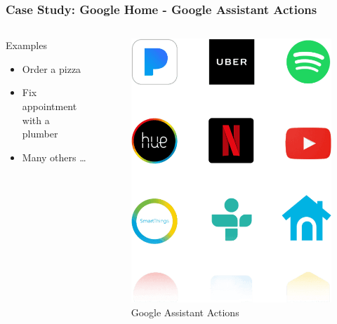 \documentclass{beamer}
\begin{document}
\begin{frame}
\frametitle{Case Study: Google Home - Google Assistant Actions}

\begin{columns}
	\begin{block}{Examples}
			\begin{itemize}
			\item Order a pizza
			\item Fix appointment with a plumber
			\item Many others \dots
		\end{itemize}
	\end{block}

	\begin{figure}
		\centering
		\includegraphics[width=0.7\linewidth]{images/logo-grid}
		\caption[Actions]{Google Assistant Actions}
		\label{fig:logo-grid}
	\end{figure}
	
\end{columns}

\end{frame}
\end{document}
